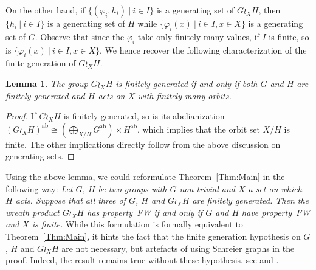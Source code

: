\documentclass[a4paper]{article}
\newtheorem{lem}{Lemma}[section]
\newtheorem{prop}[lem]{Proposition}
\theoremstyle{definition}
\theoremstyle{remark}
\DeclareMathOperator\ab{ab}
\newcommand{\setst}[2]{\{#1\ |\ #2\}}
\begin{document}
On the other hand, if $\setst{(\varphi_i,h_i)}{i\in I}$ is a generating set of $G\wr_XH$, then $\setst{h_i}{i\in I}$ is a generating set of $H$ while $\setst{\varphi_i(x)}{i\in I,x\in X}$ is a generating set of $G$.
Observe that since the $\varphi_i$ take only finitely many values, if $I$ is finite, so is $\setst{\varphi_i(x)}{i\in I,x\in X}$.
We hence recover the following characterization of the finite generation of $G\wr_XH$.


\begin{lem}
The group $G\wr_XH$ is finitely generated if and only if both $G$ and $H$ are finitely generated and $H$ acts on $X$ with finitely many orbits.
\end{lem}
\begin{proof}
If $G\wr_XH$ is finitely generated, so is its abelianization $(G\wr_XH)^{\ab}\cong (\bigoplus_{X/H}G^{\ab})\times H^{\ab}$, which implies that the orbit set $X/H$ is finite. The other implications directly follow from the above discussion on generating sets.
\end{proof}
%
%
%
%
Using the above lemma, we could reformulate Theorem~\ref{Thm:Main} in the following way: \textit{Let $G$, $H$ be two groups with $G$ non-trivial and $X$ a set on which $H$ acts. Suppose that all three of $G$, $H$ and $G\wr_XH$ are finitely generated. Then the wreath product $G\wr_XH$ has property~FW if and only if $G$ and $H$ have property~FW and $X$ is finite.}
While this formulation is formally equivalent to Theorem~\ref{Thm:Main}, it  hints the fact that the finite generation hypothesis on $G$, $H$ and $G\wr_XH$ are not necessary, but artefacts of using Schreier graphs in the proof. Indeed, the result remains true without these hypothesis, see \cite[Propositions 5.B.3 \& 5.B.4]{Cornulier2013} and \cite[Theorem A]{LS2021}.
\end{document}
